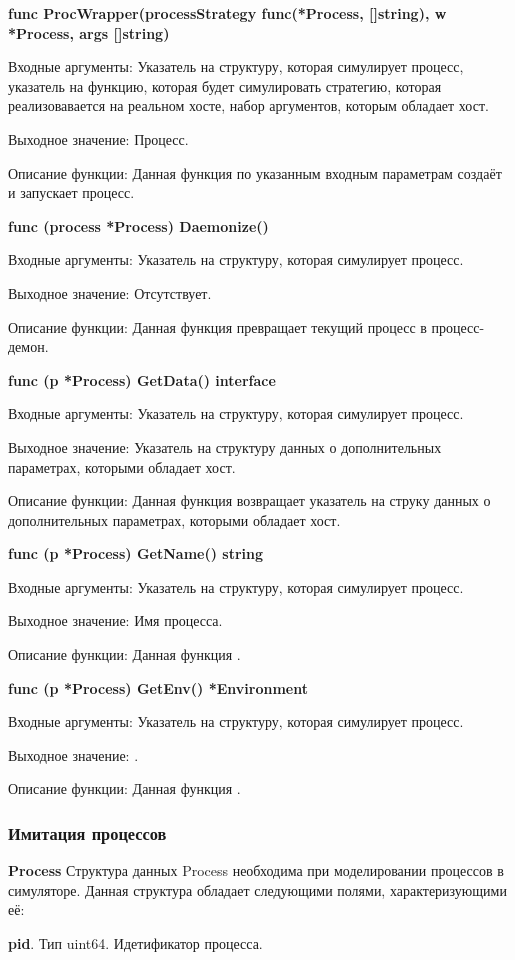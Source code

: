 \textbf{func ProcWrapper(processStrategy func(*Process, []string), w *Process, args []string)}

Входные аргументы: Указатель на структуру, которая симулирует процесс, указатель на функцию, которая будет симулировать стратегию, которая реализовавается на реальном хосте, набор аргументов, которым обладает хост.

Выходное значение: Процесс.

Описание функции: Данная функция по указанным входным параметрам создаёт и запускает процесс.


\textbf{func (process *Process) Daemonize() }

Входные аргументы: Указатель на структуру, которая симулирует процесс.

Выходное значение: Отсутствует.

Описание функции: Данная функция превращает текущий процесс в процесс-демон.


\textbf{func (p *Process) GetData() interface}

Входные аргументы: Указатель на структуру, которая симулирует процесс.

Выходное значение: Указатель на структуру данных о дополнительных параметрах, которыми обладает хост.

Описание функции: Данная функция возвращает указатель на струку данных о дополнительных параметрах, которыми обладает хост.


\textbf{func (p *Process) GetName() string}

Входные аргументы: Указатель на структуру, которая симулирует процесс.

Выходное значение: Имя процесса.

Описание функции: Данная функция .

\textbf{func (p *Process) GetEnv() *Environment}

Входные аргументы: Указатель на структуру, которая симулирует процесс.

Выходное значение: .

Описание функции: Данная функция .

\subsubsection{Имитация процессов}
\textbf{Process}
Структура данных Process необходима при моделировании процессов в симуляторе. Данная структура обладает следующими полями, характеризующими  её:

\textbf{	pid}. Тип uint64. Идетификатор процесса. 

